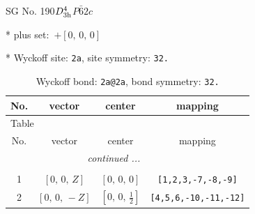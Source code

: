 \documentclass[fleqn,8pt]{jsarticle}
\begin{document}
\setcounter{MaxMatrixCols}{32}

\renewcommand{\tablename}{Table~}
\renewcommand{\figurename}{Figure~}
\begin{center}
\LARGE
SG No. 190\quad$D_{\rm 3h}^{4}$\quad$P\bar{6}2c$\quad[ hexagonal ]
\end{center}

* plus set:\,\,\,$+\left[ 0,\, 0,\, 0 \right]$


* Wyckoff site: {\tt 2a}, site symmetry: {\tt 32.}
\renewcommand{\arraystretch}{1.2}
\begin{longtable}{cccc}
\caption{Wyckoff bond: {\tt 2a@2a}, bond symmetry: {\tt 32.}}
 \\
 \hline \hline
No. & vector & center & mapping \\ \hline \endfirsthead

\multicolumn{3}{l}{\tablename\ \thetable{}} \\
 \hline \hline
No. & vector & center & mapping \\ \hline \endhead

 \hline \hline
\multicolumn{3}{r}{\footnotesize\it continued ...} \\ \endfoot

 \hline \hline
\multicolumn{3}{r}{} \\ \endlastfoot

1 & $\left[ 0,\, 0,\, Z \right]$ & $\left[ 0,\, 0,\, 0 \right]$ & {\tt [1,2,3,-7,-8,-9]} \\ \hline
2 & $\left[ 0,\, 0,\, - Z \right]$ & $\left[ 0,\, 0,\, \frac{1}{2} \right]$ & {\tt [4,5,6,-10,-11,-12]} \\
\end{longtable}
\renewcommand{\arraystretch}{1.2}
\end{document}
